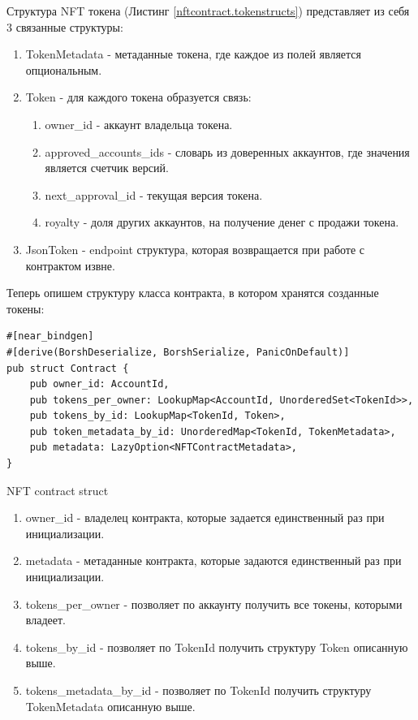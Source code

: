 Структура NFT токена (Листинг {\color{blue} \ref{nftcontract.tokenstructs}}) представляет из себя 3 связанные структуры:
\begin{enumerate}
    \item TokenMetadata - метаданные токена, где каждое из полей является опциональным.
    \item Token - для каждого токена образуется связь:
    \begin{enumerate}
        \item owner\_id - аккаунт владельца токена.
        \item approved\_accounts\_ids - словарь из доверенных аккаунтов, где значения является счетчик версий.
        \item next\_approval\_id - текущая версия токена.
        \item royalty - доля других аккаунтов, на получение денег с продажи токена.
    \end{enumerate}
    \item JsonToken - endpoint структура, которая возвращается при работе с контрактом извне.
\end{enumerate}

Теперь опишем структуру класса контракта, в котором хранятся созданные токены:
\begin{listing}[H]
\begin{verbatim}
#[near_bindgen]
#[derive(BorshDeserialize, BorshSerialize, PanicOnDefault)]
pub struct Contract {
    pub owner_id: AccountId,
    pub tokens_per_owner: LookupMap<AccountId, UnorderedSet<TokenId>>,
    pub tokens_by_id: LookupMap<TokenId, Token>,
    pub token_metadata_by_id: UnorderedMap<TokenId, TokenMetadata>,
    pub metadata: LazyOption<NFTContractMetadata>,
}
\end{verbatim}
\caption{NFT contract struct}
\label{nftcontract.struct}
\end{listing}

\begin{enumerate}
\item owner\_id - владелец контракта, которые задается единственный раз при инициализации.
\item metadata - метаданные контракта, которые задаются единственный раз при инициализации.
\item tokens\_per\_owner - позволяет по аккаунту получить все токены, которыми владеет.
\item tokens\_by\_id - позволяет по TokenId получить структуру Token описанную выше.
\item tokens\_metadata\_by\_id - позволяет по TokenId получить структуру TokenMetadata описанную выше.
\end{enumerate}

